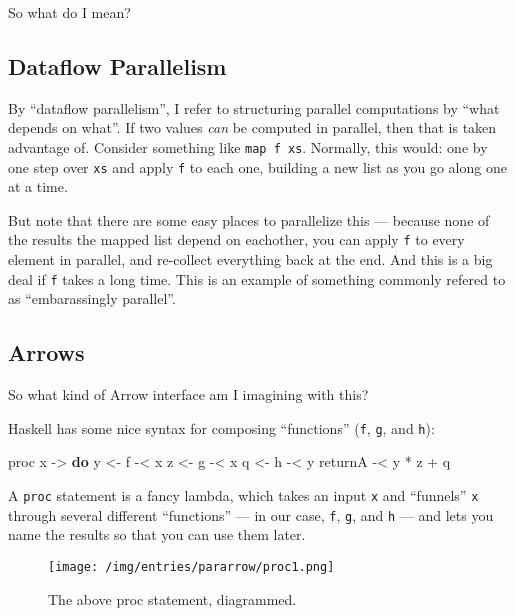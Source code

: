 \documentclass[]{article}
\newenvironment{Shaded}{}{}
\newcommand{\KeywordTok}[1]{\textcolor[rgb]{0.00,0.44,0.13}{\textbf{#1}}}
\newcommand{\OtherTok}[1]{\textcolor[rgb]{0.00,0.44,0.13}{#1}}
\newcommand{\FunctionTok}[1]{\textcolor[rgb]{0.02,0.16,0.49}{#1}}
\newcommand{\NormalTok}[1]{#1}
\begin{document}
So what do I mean?

\subsection{Dataflow Parallelism}\label{dataflow-parallelism}

By ``dataflow parallelism'', I refer to structuring parallel computations by
``what depends on what''. If two values \emph{can} be computed in parallel, then
that is taken advantage of. Consider something like \texttt{map\ f\ xs}.
Normally, this would: one by one step over \texttt{xs} and apply \texttt{f} to
each one, building a new list as you go along one at a time.

But note that there are some easy places to parallelize this --- because none of
the results the mapped list depend on eachother, you can apply \texttt{f} to
every element in parallel, and re-collect everything back at the end. And this
is a big deal if \texttt{f} takes a long time. This is an example of something
commonly refered to as ``embarassingly parallel''.

\subsection{Arrows}\label{arrows}

So what kind of Arrow interface am I imagining with this?

Haskell has some nice syntax for composing ``functions'' (\texttt{f},
\texttt{g}, and \texttt{h}):

\begin{Shaded}
\begin{Highlighting}[]
\NormalTok{proc x }\OtherTok{->} \KeywordTok{do}
\NormalTok{    y }\OtherTok{<-}\NormalTok{ f }\FunctionTok{-<}\NormalTok{ x}
\NormalTok{    z }\OtherTok{<-}\NormalTok{ g }\FunctionTok{-<}\NormalTok{ x}
\NormalTok{    q }\OtherTok{<-}\NormalTok{ h }\FunctionTok{-<}\NormalTok{ y}
\NormalTok{    returnA }\FunctionTok{-<}\NormalTok{ y }\FunctionTok{*}\NormalTok{ z }\FunctionTok{+}\NormalTok{ q}
\end{Highlighting}
\end{Shaded}

A \texttt{proc} statement is a fancy lambda, which takes an input \texttt{x} and
``funnels'' \texttt{x} through several different ``functions'' --- in our case,
\texttt{f}, \texttt{g}, and \texttt{h} --- and lets you name the results so that
you can use them later.

\begin{figure}
\centering
\texttt{[image: /img/entries/pararrow/proc1.png]}
\caption{The above proc statement, diagrammed.}
\end{figure}
\end{document}
